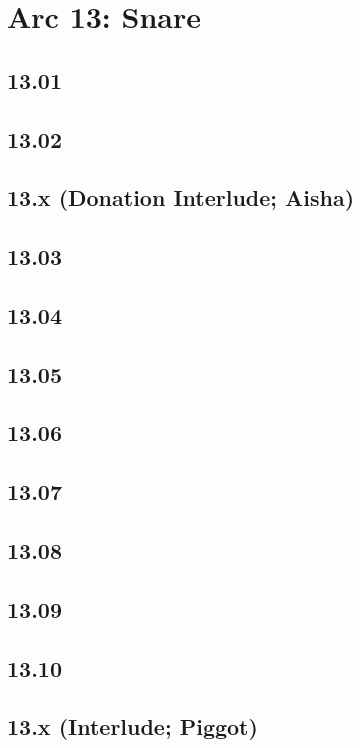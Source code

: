 \part{Arc 13: Snare}
 \chapter{13.01}
 \chapter{13.02}
 \chapter{13.x (Donation Interlude; Aisha)}
 \chapter{13.03}
 \chapter{13.04}
 \chapter{13.05}
 \chapter{13.06}
 \chapter{13.07}
 \chapter{13.08}
 \chapter{13.09}
 \chapter{13.10}
 \chapter{13.x (Interlude; Piggot)}













